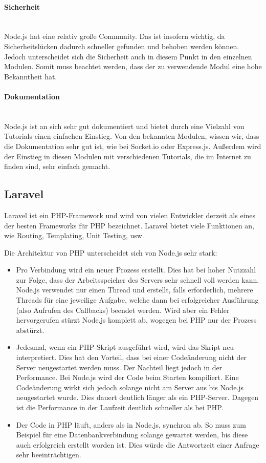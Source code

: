 \documentclass[11pt]{article}
\begin{document}
\paragraph{Sicherheit} \mbox{}\\
Node.js hat eine relativ gro{\ss}e Community. Das ist insofern wichtig, da Sicherheitsl\"ucken dadurch schneller gefunden und behoben werden k\"onnen. Jedoch unterscheidet sich die Sicherheit auch in diesem Punkt in den einzelnen Modulen. Somit muss beachtet werden, dass der zu verwendende Modul eine hohe Bekanntheit hat.

\paragraph{Dokumentation} \mbox{}\\
Node.js ist an sich sehr gut dokumentiert und bietet durch eine Vielzahl von Tutorials einen einfachen Einstieg. Von den bekannten Modulen, wissen wir, dass die Dokumentation sehr gut ist, wie bei Socket.io oder Express.js. Au{\ss}erdem wird der Einstieg in diesen Modulen mit verschiedenen Tutorials, die im Internet zu finden sind, sehr einfach gemacht.

\subsection{Laravel}
Laravel ist ein PHP-Framework und wird von vielen Entwickler derzeit als eines der besten Frameworks f\"ur PHP bezeichnet.
Laravel bietet viele Funktionen an, wie Routing, Templating, Unit Testing, usw.

Die Architektur von PHP unterscheidet sich von Node.js sehr stark:
\begin{itemize}
    \item Pro Verbindung wird ein neuer Prozess erstellt. Dies hat bei hoher Nutzzahl zur Folge, dass der Arbeitsspeicher des Servers sehr schnell voll werden kann.
    Node.js verwendet nur einen Thread und erstellt, falls erforderlich, mehrere Threads f\"ur eine jeweilige Aufgabe, welche dann bei erfolgreicher Ausf\"uhrung (also Aufrufen des Callbacks) beendet werden. Wird aber ein Fehler hervorgerufen st\"urzt Node.js komplett ab, wogegen bei PHP nur der Prozess abst\"urzt.
    \item Jedesmal, wenn ein PHP-Skript ausgef\"uhrt wird, wird das Skript neu interpretiert. Dies hat den Vorteil, dass bei einer Code\"anderung nicht der Server neugestartet werden muss. Der Nachteil liegt jedoch in der Performance.
    Bei Node.js wird der Code beim Starten kompiliert. Eine Code\"anderung wirkt sich jedoch solange nicht am Server aus bis Node.js neugestartet wurde. Dies dauert deutlich l\"anger als ein PHP-Server. Dagegen ist die Performance in der Laufzeit deutlich schneller als bei PHP.
    \item Der Code in PHP l\"auft, anders als in Node.js, synchron ab. So muss zum Beispiel f\"ur eine Datenbankverbindung solange gewartet werden, bis diese auch erfolgreich erstellt worden ist. Dies w\"urde die Antwortzeit einer Anfrage sehr beeintr\"achtigen.
\end{itemize}
\end{document}
